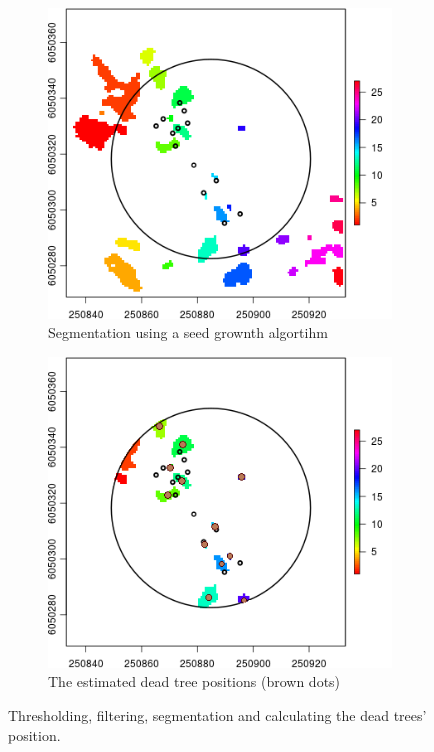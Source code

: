 \documentclass{subfiles}
\begin{document}
\begin{figure} [h!]
\begin{subfigure}[t]{.49\textwidth}
  		\caption{} 
  		\label{fig:c9_sharpFilter}
  	\end{subfigure} \hfill
  	\begin{subfigure}[t]{.49\textwidth}
  		\centering
  		\includegraphics[width=\textwidth]{img/dead/c10_segmentationResults}
  		\caption{Segmentation using a seed grownth algortihm}
  		\label{fig:c10_segmentation}
  	\end{subfigure}
  	\begin{subfigure}[t]{.49\textwidth}
  		\centering
  		\includegraphics[width=\textwidth]{img/dead/c11_TreePos}
  		\caption{The estimated dead tree positions (brown dots)} 
  		\label{fig:c11_results}
  	\end{subfigure}
  	\caption{Thresholding, filtering, segmentation and calculating the dead trees' position. }  
  	\label{fig:dt_sf_segm_results} 
  \end{figure}
  
\end{document}
